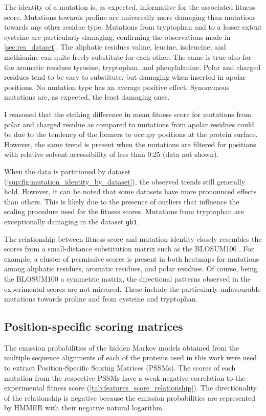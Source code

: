 The identity of a mutation is, as expected, informative for the associated fitness score.
Mutations towards proline are universally more damaging than mutations towards any other residue type.
Mutations from tryptophan and to a lesser extent cysteine are particularly damaging, confirming the observations made in \autoref{sec:res_dataset}.
The aliphatic residues valine, leucine, isoleucine, and methionine can quite freely substitute for each other.
The same is true also for the aromatic residues tyrosine, tryptophan, and phenylalanine.
Polar and charged residues tend to be easy to substitute, but damaging when inserted in apolar positions.
No mutation type has an average positive effect.
Synonymous mutations are, as expected, the least damaging ones.

I reasoned that the striking difference in mean fitness score for mutations from polar and charged residue as compared to mutations from apolar residues could be due to the tendency of the formers to occupy positions at the protein surface.
However, the same trend is present when the mutations are filtered for positions with relative solvent accessibility of less than \num{0.25} (data not shown).

When the data is partitioned by dataset (\autoref{sup:fig:mutation_identity_by_dataset}), the observed trends still generally hold.
However, it can be noted that some datasets have more pronounced effects than others.
This is likely due to the presence of outliers that influence the scaling procedure used for the fitness scores.
Mutations from tryptophan are exceptionally damaging in the dataset \texttt{gb1}.

The relationship between fitness score and mutation identity closely resembles the scores from a small-distance substitution matrix such as the BLOSUM100 \parencite[\autoref{subfig:blosum100}]{Henikoff1992}.
For example, a cluster of permissive scores is present in both heatmaps for mutations among aliphatic residues, aromatic residues, and polar residues.
Of course, being the BLOSUM100 a symmetric matrix, the directional patterns observed in the experimental scores are not mirrored.
These include the particularly unfavourable mutations towards proline and from cysteine and tryptophan.

\subsection{Position-specific scoring matrices}
The emission probabilities of the hidden Markov models obtained from the multiple sequence alignments of each of the proteins used in this work were used to extract Position-Specific Scoring Matrices (PSSMs).
The scores of each mutation from the respective PSSMs have a weak negative correlation to the experimental fitness score (\autoref{tab:features_score_relationship}).
The directionality of the relationship is negative because the emission probabilities are represented by HMMER with their negative natural logarithm.


